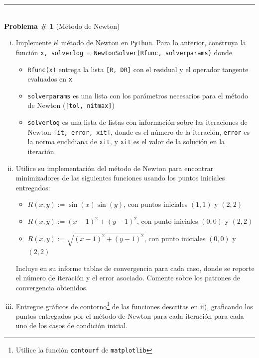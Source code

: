 \documentclass[11pt,letterpaper]{article}
\begin{document}
\rule{\linewidth}{0.4mm}\\[20pt]



{\bf Problema \# 1} (M\'etodo de Newton) 
\begin{enumerate}[i)]
\item Implemente el m\'etodo de Newton en {\tt Python}. Para lo anterior, construya la funci\'on 
{\tt  x, solverlog = NewtonSolver(Rfunc, solverparams)} donde 
\begin{itemize}
	\item {\tt Rfunc(x)} entrega la lista {\tt  [R, DR]} con el residual y el operador tangente evaluados en {\tt x}
	\item {\tt solverparams} es una lista con los par\'ametros necesarios para el m\'etodo de Newton ({\tt [tol, nitmax]})
	\item {\tt solverlog} es una lista de listas con informaci\'on sobre las iteraciones de Newton {\tt [it, error, xit]}, donde {\it} es el n\'umero de la iteraci\'on, {\tt error} es la norma euclidiana de {\tt xit}, y {\tt xit} es el valor de la soluci\'on en la iteraci\'on.
\end{itemize}

\item Utilice su implementaci\'on del m\'etodo de Newton para encontrar minimizadores de las siguientes funciones usando los puntos iniciales entregados:
	\begin{itemize}
		\item $R(x,y):= \sin(x)\sin(y)$, con puntos iniciales $(1,1)$ y $(2,2)$
		\item $R(x,y):= (x-1)^2 + (y-1)^2$, con punto iniciales $(0,0)$ y $(2,2)$
		\item $R(x,y):= \sqrt{ (x-1)^2 + (y-1)^2}$, con punto iniciales $(0,0)$ y $(2,2)$
	\end{itemize}
	Incluye en su informe tablas de convergencia para cada caso, donde se reporte el n\'umero de iteraci\'on y el error asociado. Comente sobre los patrones de convergencia obtenidos.

\item Entregue gr\'aficos de contorno\footnote{Utilice la funci\'on {\tt contourf} de {\tt matplotlib}} de las funciones descritas en ii), graficando los puntos entregados por el m\'etodo de Newton para cada iteraci\'on para cada uno de los casos de condici\'on inicial.

\end{enumerate}	
\end{document}
